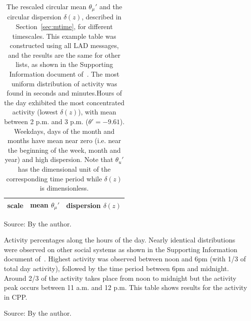 \begin{table}
\caption{The rescaled circular mean $\theta_\mu'$ and the circular dispersion $\delta(z)$, described in Section~\ref{sec:mtime}, for different timescales. This example table was constructed using all LAD messages, and the results are the same for other lists, as shown in the Supporting Information document of~\cite{stab}. The most uniform distribution of activity was found in seconds and minutes.Hours of the day exhibited the most concentrated activity (lowest $\delta(z)$), with mean between 2 p.m. and 3 p.m. ($\theta'=-9.61$). Weekdays, days of the month and months have mean near zero (i.e. near the beginning of the week, month and year) and high dispersion. Note that $\theta_u'$ has the dimensional unit of the corresponding time period while $\delta(z)$ is dimensionless.}
\begin{center}
\begin{tabular}{ l|| c|c }
\hline
scale & mean $\theta_\mu'$ & dispersion $\delta(z)$  \\ \hline

\end{tabular}
\begin{flushleft}\footnotesize
Source: By the author.\
\end{flushleft}
\end{center}
\label{tab:circ}
\end{table}

\begin{table}
\caption{Activity percentages along the hours of the day. Nearly identical distributions were observed on other social systems as shown in the Supporting Information document of~\cite{stab}.
Highest activity was observed between noon and 6pm (with 1/3 of total day activity), followed by the time period between 6pm and midnight.
Around 2/3 of the activity takes place from noon to midnight
but the activity peak occurs between 11 a.m. and 12 p.m.
This table shows results for the activity in CPP.}
\footnotesize

\label{tab:hin}
\begin{flushleft}\footnotesize
Source: By the author.\
\end{flushleft}
\end{table}



